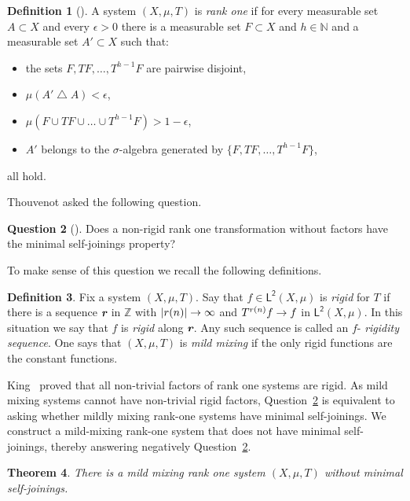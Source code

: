 \documentclass[10pt]{amsart}
\newtheorem{theo}{Theorem}[section]
\theoremstyle{definition}\newtheorem{defi}[theo]{Definition}\newtheorem{rema}[theo]{Remark}\newtheorem{exam}[theo]{Example}\newtheorem{exem}[theo]{Example}\newtheorem{nota}[theo]{Notation}
\DeclareMathOperator{\symdiff}{\triangle}
\newcommand{\N}{\mathbb{N}}
\newcommand{\Z}{\mathbb{Z}}
\newcommand{\lp}{\mathsf{L}}
\newcommand{\ltwo}{\lp^{\!\mathsf{2}}}
\def\mathbi#1{\textbf{\em #1}}
\newcommand{\bir}{\mathbi{r}}
\renewcommand*{\to}{\mathchoice{\longrightarrow}{\rightarrow}{\rightarrow}{\rightarrow}}
\newtheorem{ques}[theo]{Question}
\begin{document}
\begin{defi}[{\cite[Definition~6]{MR1436950}}]
A system $(X,\mu,T)$ is
\emph{rank one} if for every measurable set $A \subset X$ and every $\epsilon > 0$ there is a measurable set $F \subset X$ and $h \in \N$ and a measurable set $A' \subset X$ such that:
\begin{itemize}
\item the sets $F, TF,\dots,T^{h-1} F$ are pairwise disjoint,
\item $\mu(A' \symdiff A) < \epsilon$,
\item $\mu(F \cup TF \cup \dots \cup T^{h-1} F) > 1 - \epsilon$,
\item $A'$ belongs to the $\sigma$-algebra generated by $\{ F, TF,\dots, T^{h-1} F\}$,
\end{itemize}
all hold.
\end{defi}

Thouvenot asked the following question.

\begin{ques}[{\cite[\S~1.2 in Section~12]{MR4232241}}]\label{q:thouvenot}
Does a non-rigid rank one transformation without factors have the minimal self-joinings property?
\end{ques}

To make sense of this question we recall the following definitions.

\begin{defi}
Fix a system $(X,\mu,T)$. Say that $f \in \ltwo(X,\mu)$ is
\emph{rigid} for $T$ if there is a sequence $ \bir$ in $\Z$ with $|r(n)| \to \infty$ and $T^{r(n)} f \to f$ in $\ltwo(X,\mu)$. In this situation we say that $f$ is
\emph{rigid} along $\bir$. Any such sequence is called an $f$-
\emph{rigidity sequence}. One says that $(X,\mu,T)$ is
\emph{mild mixing} if the only rigid functions are the constant functions.
\end{defi}

King~\cite[p.~377]{MR0863200} proved that all non-trivial factors of rank one systems are rigid. As mild mixing systems cannot have non-trivial rigid factors, Question~\ref{q:thouvenot} is equivalent to asking whether mildly mixing rank-one systems have minimal self-joinings. We construct a mild-mixing rank-one system that does not have minimal self-joinings, thereby answering negatively Question~\ref{q:thouvenot}.


\begin{theo}\label{thm:main}
There is a mild mixing rank one system $(X,\mu,T)$ without minimal self-joinings.
\end{theo}
\end{document}
